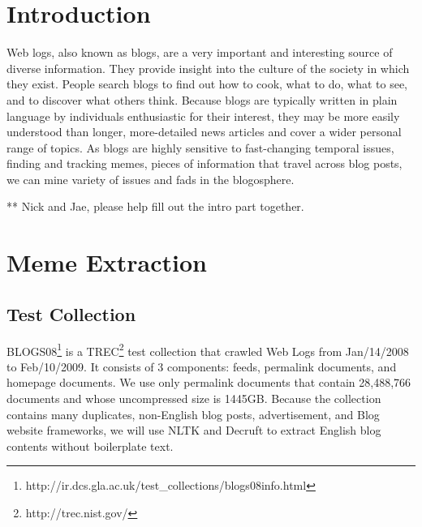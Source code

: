 \documentclass{sig-alternate}
\begin{document}



\section{Introduction}

Web logs, also known as blogs, are a very important and interesting source of diverse information. They provide insight into the culture of the society in which they exist. People search blogs to find out how to cook, what to do, what to see, and to discover what others think. Because blogs are typically written in plain language by individuals enthusiastic for their interest, they may be more easily understood than longer, more-detailed news articles and cover a wider personal range of topics. 
As blogs are highly sensitive to fast-changing temporal issues, finding and tracking memes, pieces of information that travel across blog posts, we can mine variety of issues and fads in the blogosphere.

** Nick and Jae, please help fill out the intro part together.


\section{Meme Extraction}

\subsection{Test Collection}

BLOGS08\footnote{http://ir.dcs.gla.ac.uk/test\_collections/blogs08info.html} is a TREC\footnote{http://trec.nist.gov/} test collection that crawled Web Logs from Jan/14/2008 to Feb/10/2009. It consists of 3 components: feeds, permalink documents, and homepage documents. We use only permalink documents that contain 28,488,766 documents and whose uncompressed size is 1445GB. Because the collection contains many duplicates, non-English blog posts, advertisement, and Blog website frameworks, we will use NLTK and Decruft to extract English blog contents without boilerplate text.
\end{document}
